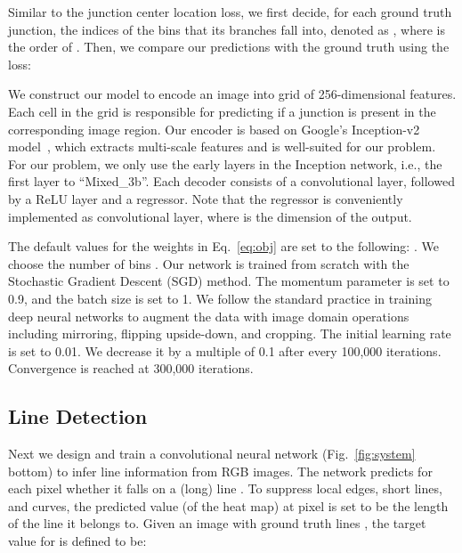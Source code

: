\documentclass[10pt,twocolumn,letterpaper]{article}
\begin{document}
   
 Similar to the junction center location loss, we first decide, for each ground truth junction, the indices of the bins that its branches fall into, denoted as , where  is the order of . Then, we compare our predictions with the ground truth using the  loss:\vspace{-2mm}
\begin{small}

\end{small}




 We construct our model to encode an image into  grid of 256-dimensional features. Each cell in the grid is responsible for predicting if a junction is present in the corresponding image region. Our encoder is based on Google's Inception-v2 model~\cite{Szegedy2016RethinkingTI}, which extracts multi-scale features and is well-suited for our problem. For our problem, we only use the early layers in the Inception network, i.e., the first layer to ``Mixed\_3b''. Each decoder consists of a  convolutional layer, followed by a ReLU layer and a regressor. Note that the regressor is conveniently implemented as  convolutional layer, where  is the dimension of the output.

The default values for the weights in Eq.~\eqref{eq:obj} are set to the following: . We choose the number of bins . Our network is trained from scratch with the Stochastic Gradient Descent (SGD) method. The momentum parameter is set to 0.9, and the batch size is set to 1. We follow the standard practice in training deep neural networks to augment the data with image domain operations including mirroring, flipping upside-down, and cropping. The initial learning rate is set to 0.01. We decrease it by a multiple of 0.1 after every 100,000 iterations. Convergence is reached at 300,000 iterations.







\subsection{Line Detection}
Next we design and train a convolutional neural network (Fig.~\ref{fig:system} bottom) to infer line information from RGB images. The network predicts for each pixel  whether it falls on a (long) line . To suppress local edges, short lines, and curves, the predicted value  (of the heat map) at pixel  is set to be the length of the line it belongs to. Given an image with ground truth lines , the target value for  is defined to be:\vspace{-2mm}
\end{document}
